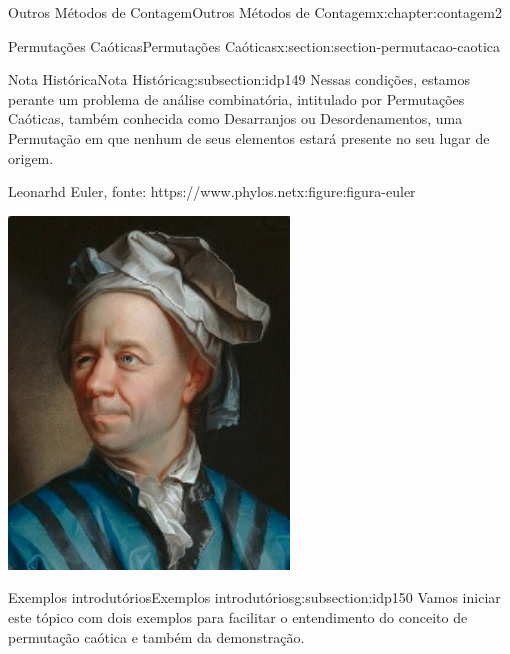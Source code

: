 \documentclass[oneside,10pt,]{book}
\numberwithin{equation}{section}
\begin{document}
\begin{chapterptx}{Outros Métodos de Contagem}{}{Outros Métodos de Contagem}{}{}{x:chapter:contagem2}
\begin{sectionptx}{Permutações Caóticas}{}{Permutações Caóticas}{}{}{x:section:section-permutacao-caotica}
\begin{subsectionptx}{Nota Histórica}{}{Nota Histórica}{}{}{g:subsection:idp149}
Nessas condições, estamos perante um problema de análise combinatória, intitulado por Permutações Caóticas, também conhecida como Desarranjos ou Desordenamentos, uma Permutação em que nenhum de seus elementos estará presente no seu lugar de origem.%
\begin{figureptx}{Leonarhd Euler, fonte: https:\slash{}\slash{}www.phylos.net}{x:figure:figura-euler}{}%
\begin{image}{0.35}{0.3}{0.35}%
\includegraphics[width=\linewidth]{images/Euler.jpg}
\end{image}%
\tcblower
\end{figureptx}%
\end{subsectionptx}
%
%
\typeout{************************************************}
\typeout{************************************************}
%
\begin{subsectionptx}{Exemplos introdutórios}{}{Exemplos introdutórios}{}{}{g:subsection:idp150}
Vamos iniciar este tópico com dois exemplos para facilitar o entendimento do conceito de permutação caótica e também da demonstração.%

\end{subsectionptx}
\end{sectionptx}
\end{chapterptx}
\end{document}
